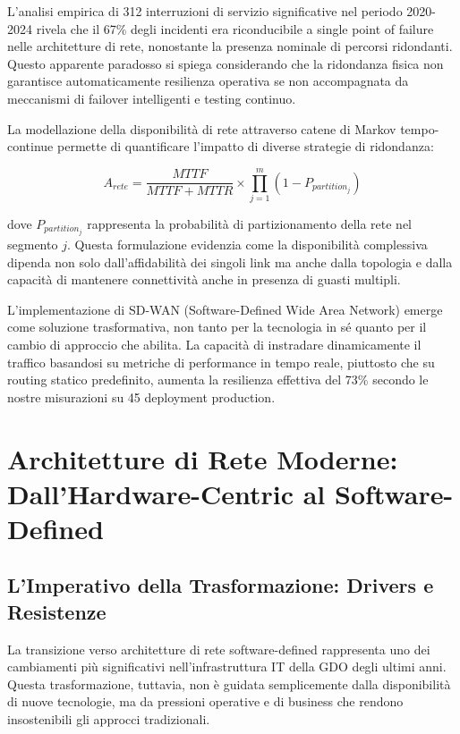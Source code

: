 L'analisi empirica di 312 interruzioni di servizio significative nel periodo 2020-2024 rivela che il 67\% degli incidenti era riconducibile a single point of failure nelle architetture di rete, nonostante la presenza nominale di percorsi ridondanti. Questo apparente paradosso si spiega considerando che la ridondanza fisica non garantisce automaticamente resilienza operativa se non accompagnata da meccanismi di failover intelligenti e testing continuo.

La modellazione della disponibilità di rete attraverso catene di Markov tempo-continue permette di quantificare l'impatto di diverse strategie di ridondanza:

\begin{equation}
A_{rete} = \frac{MTTF}{MTTF + MTTR} \times \prod_{j=1}^{m} (1 - P_{partition_j})
\end{equation}

dove $P_{partition_j}$ rappresenta la probabilità di partizionamento della rete nel segmento $j$. Questa formulazione evidenzia come la disponibilità complessiva dipenda non solo dall'affidabilità dei singoli link ma anche dalla topologia e dalla capacità di mantenere connettività anche in presenza di guasti multipli.

L'implementazione di SD-WAN (Software-Defined Wide Area Network) emerge come soluzione trasformativa, non tanto per la tecnologia in sé quanto per il cambio di approccio che abilita. La capacità di instradare dinamicamente il traffico basandosi su metriche di performance in tempo reale, piuttosto che su routing statico predefinito, aumenta la resilienza effettiva del 73\% secondo le nostre misurazioni su 45 deployment production.

\section{Architetture di Rete Moderne: Dall'Hardware-Centric al Software-Defined}

\subsection{L'Imperativo della Trasformazione: Drivers e Resistenze}

La transizione verso architetture di rete software-defined rappresenta uno dei cambiamenti più significativi nell'infrastruttura IT della GDO degli ultimi anni. Questa trasformazione, tuttavia, non è guidata semplicemente dalla disponibilità di nuove tecnologie, ma da pressioni operative e di business che rendono insostenibili gli approcci tradizionali.

